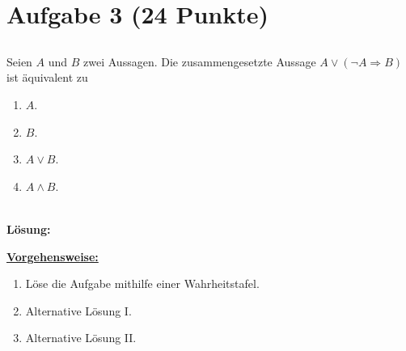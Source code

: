 \section*{Aufgabe 3 (24 Punkte)}
\vspace{0.4cm}
\subsection*{}
Seien $ A $ und $ B $ zwei Aussagen. Die zusammengesetzte Aussage $ A \vee (\neg A \Rightarrow B) $ ist äquivalent zu
\renewcommand{\labelenumi}{(\alph{enumi})}
\begin{enumerate}
	\item $ A $.
	\item $ B $.
	\item $ A \vee B $.
	\item $ A \wedge B $.
\end{enumerate}
\ \\
\textbf{Lösung:}
\begin{mdframed}
\underline{\textbf{Vorgehensweise:}}
\renewcommand{\labelenumi}{\theenumi.}
\begin{enumerate}
\item Löse die Aufgabe mithilfe einer Wahrheitstafel.
\item Alternative Lösung I.
\item Alternative Lösung II.
\end{enumerate}
\end{mdframed}

